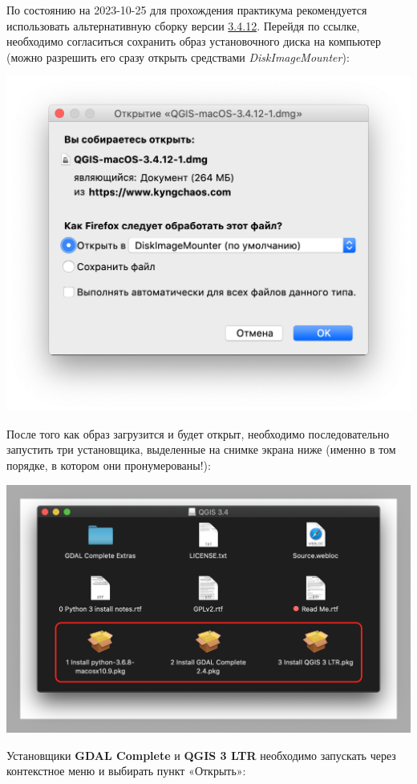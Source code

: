 \documentclass[
  12pt,
]{book}
\begin{document}
По состоянию на 2023-10-25 для прохождения практикума рекомендуется использовать альтернативную сборку версии \href{https://www.kyngchaos.com/files/software/qgis/QGIS-macOS-3.4.12-1.dmg}{3.4.12}. Перейдя по ссылке, необходимо согласиться сохранить образ установочного диска на компьютер (можно разрешить его сразу открыть средствами \emph{DiskImageMounter}):

\includegraphics{images/Index0/mac01.png}

После того как образ загрузится и будет открыт, необходимо последовательно запустить три установщика, выделенные на снимке экрана ниже (именно в том порядке, в котором они пронумерованы!):

\includegraphics{images/Index0/mac02.png}

Установщики \textbf{GDAL Complete} и \textbf{QGIS 3 LTR} необходимо запускать через контекстное меню и выбирать пункт «Открыть»:
\end{document}
